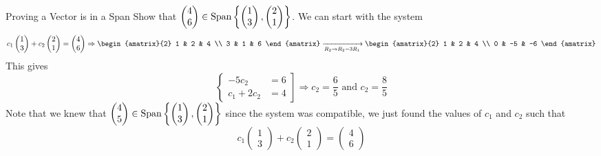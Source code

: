 \begin{example}{Proving a Vector is in a Span}{}
    Show that $\begin{pmatrix} 4 \\ 6 \end{pmatrix} \in \text{Span}\left\{\begin{pmatrix} 1 \\ 3 \end{pmatrix}, \begin{pmatrix} 2 \\ 1 \end{pmatrix} \right\}$. We can start with the system 
    \[
        c_1\begin{pmatrix} 1 \\ 3 \end{pmatrix} + c_2\begin{pmatrix} 2 \\ 1\end{pmatrix} = \begin{pmatrix} 4 \\ 6 \end{pmatrix}
        \Rightarrow 
        \begin{amatrix}{2}
            1 & 2 & 4 \\
            3 & 1 & 6
        \end{amatrix}
        \xrightarrow[R_2 \to R_2 - 3R_1]{}
        \begin{amatrix}{2}
            1 & 2 & 4 \\
            0 & -5 & -6
        \end{amatrix}
    \]
    This gives 
    \[
        \left.\begin{cases}
            -5c_2 &= 6 \\
            c_1 + 2c_2 &= 4
        \end{cases}\right]
        \Rightarrow 
        c_2 = \frac{6}{5} \text{ and } c_2 = \frac{8}{5}
    \]
    Note that we knew that $\begin{pmatrix} 4 \\ 5 \end{pmatrix} \in \text{Span}\left\{\begin{pmatrix} 1 \\ 3 \end{pmatrix}, \begin{pmatrix} 2 \\ 1 \end{pmatrix} \right\}$ since the system was compatible, we just found the values of $c_1$ and $c_2$ such that 
    \[
        c_1\begin{pmatrix} 1 \\ 3 \end{pmatrix} + c_2\begin{pmatrix} 2 \\ 1\end{pmatrix} = \begin{pmatrix} 4 \\ 6 \end{pmatrix}
    \]
\end{example}

